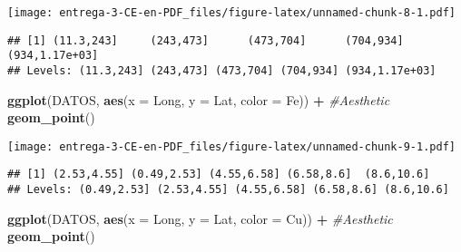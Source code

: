 \documentclass[
]{article}
\newenvironment{Shaded}{\begin{snugshade}}{\end{snugshade}}
\newcommand{\CommentTok}[1]{\textcolor[rgb]{0.56,0.35,0.01}{\textit{#1}}}
\newcommand{\DataTypeTok}[1]{\textcolor[rgb]{0.13,0.29,0.53}{#1}}
\newcommand{\DecValTok}[1]{\textcolor[rgb]{0.00,0.00,0.81}{#1}}
\newcommand{\KeywordTok}[1]{\textcolor[rgb]{0.13,0.29,0.53}{\textbf{#1}}}
\newcommand{\NormalTok}[1]{#1}
\newcommand{\OperatorTok}[1]{\textcolor[rgb]{0.81,0.36,0.00}{\textbf{#1}}}
\newcommand{\StringTok}[1]{\textcolor[rgb]{0.31,0.60,0.02}{#1}}
\begin{document}
\texttt{[image: entrega-3-CE-en-PDF\_files/figure-latex/unnamed-chunk-8-1.pdf]}

\begin{Shaded}
\end{Shaded}

\begin{verbatim}
## [1] (11.3,243]     (243,473]      (473,704]      (704,934]      (934,1.17e+03]
## Levels: (11.3,243] (243,473] (473,704] (704,934] (934,1.17e+03]
\end{verbatim}

\begin{Shaded}
\begin{Highlighting}[]
\KeywordTok{ggplot}\NormalTok{(DATOS, }\KeywordTok{aes}\NormalTok{(}\DataTypeTok{x =}\NormalTok{ Long, }\DataTypeTok{y =}\NormalTok{ Lat, }\DataTypeTok{color =}\NormalTok{ Fe)) }\OperatorTok{+}\StringTok{ }\CommentTok{#Aesthetic}
\StringTok{  }\KeywordTok{geom_point}\NormalTok{()}
\end{Highlighting}
\end{Shaded}

\texttt{[image: entrega-3-CE-en-PDF\_files/figure-latex/unnamed-chunk-9-1.pdf]}

\begin{Shaded}
\end{Shaded}

\begin{verbatim}
## [1] (2.53,4.55] (0.49,2.53] (4.55,6.58] (6.58,8.6]  (8.6,10.6] 
## Levels: (0.49,2.53] (2.53,4.55] (4.55,6.58] (6.58,8.6] (8.6,10.6]
\end{verbatim}

\begin{Shaded}
\begin{Highlighting}[]
\KeywordTok{ggplot}\NormalTok{(DATOS, }\KeywordTok{aes}\NormalTok{(}\DataTypeTok{x =}\NormalTok{ Long, }\DataTypeTok{y =}\NormalTok{ Lat, }\DataTypeTok{color =}\NormalTok{ Cu)) }\OperatorTok{+}\StringTok{ }\CommentTok{#Aesthetic}
\StringTok{  }\KeywordTok{geom_point}\NormalTok{()}
\end{Highlighting}
\end{Shaded}
\end{document}
